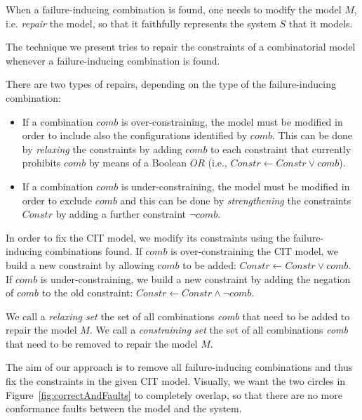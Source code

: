 \begin{tikzborder}{\cite{Gargantini16:validation}}
\begin{tikzborder}{\cite{gargantini_combinatorial_2017}}
\begin{tikzborder}{\cite{gargantini_combinatorial_2017}}
When a failure-inducing combination is found, one needs to modify the model $M$, i.e. \emph{repair} the model, so that it faithfully represents the system $S$ that it models. 
\be

The technique we present tries to repair the constraints of a combinatorial model whenever a failure-inducing combination is found. 

\bb
There are two types of repairs, depending on the type of the failure-inducing combination:
\begin{itemize}
	\item If a combination $comb$ is over-constraining, the model must be modified in order to include also the configurations identified by $comb$. This can be done by \emph{relaxing} the constraints by adding $comb$ to each constraint that currently prohibits $comb$ by means of a Boolean $\textit{OR}$ (i.e., $\mathit{Constr} \leftarrow \mathit{Constr} \vee comb$).
	
	\item If a combination $comb$ is under-constraining, the model must be modified in order to exclude $comb$ and this can be done by \emph{strengthening} the constraints $\mathit{Constr}$ by adding a further constraint $\neg comb$.
	
\end{itemize}

In order to fix the CIT model, we modify its constraints using the failure-inducing combinations found. If $comb$ is over-constraining the CIT model, we build a new constraint by allowing $comb$ to be added: $\mathit{Constr} \leftarrow \mathit{Constr} \vee comb$. If $comb$ is under-constraining, we build a new constraint by adding the negation of $comb$ to the old constraint: $\mathit{Constr} \leftarrow \mathit{Constr} \wedge \neg comb$.

\begin{defn}\label{def:modsets}
	We call a \emph{relaxing set} the set of all combinations \emph{comb} that need to be added to repair the model $M$. We call a \emph{constraining set} the set of all combinations \emph{comb} that need to be removed to repair the model $M$. 
\end{defn}

The aim of our approach is to remove all failure-inducing combinations and thus fix the constraints in the given CIT model. Visually, we want the two circles in Figure~\ref{fig:correctAndFaults} to completely overlap, so that there are no more conformance faults between the model and the system.


\end{tikzborder}
\end{tikzborder}
\end{tikzborder}
